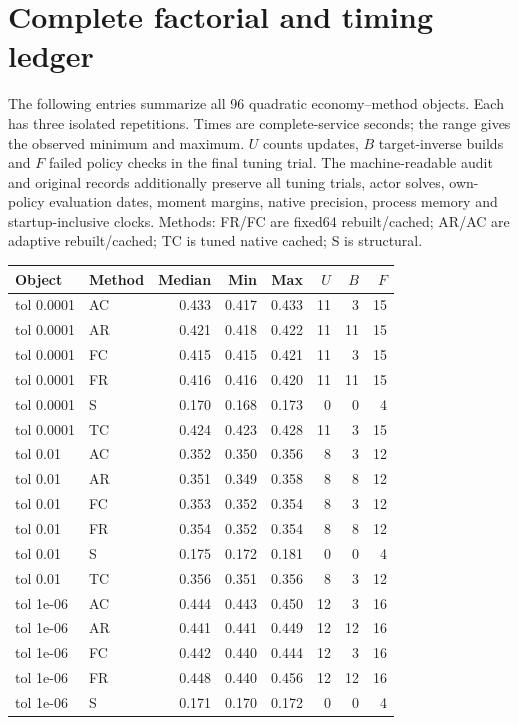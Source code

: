 \documentclass[ecta,nameyear,draft]{econsocart}
\theoremstyle{definition}
\theoremstyle{remark}
\begin{document}
\section{Complete factorial and timing ledger}\label{sec:r39ledger}
The following entries summarize all 96 quadratic economy--method objects. Each has three isolated repetitions. Times are complete-service seconds; the range gives the observed minimum and maximum. $U$ counts updates, $B$ target-inverse builds and $F$ failed policy checks in the final tuning trial. The machine-readable audit and original records additionally preserve all tuning trials, actor solves, own-policy evaluation dates, moment margins, native precision, process memory and startup-inclusive clocks. Methods: FR/FC are fixed64 rebuilt/cached; AR/AC are adaptive rebuilt/cached; TC is tuned native cached; S is structural.
\begin{longtable}{llrrrrrr}
\toprule Object & Method & Median & Min & Max & $U$ & $B$ & $F$\\\midrule\endhead
tol 0.0001 & AC & 0.433 & 0.417 & 0.433 & 11 & 3 & 15\\
tol 0.0001 & AR & 0.421 & 0.418 & 0.422 & 11 & 11 & 15\\
tol 0.0001 & FC & 0.415 & 0.415 & 0.421 & 11 & 3 & 15\\
tol 0.0001 & FR & 0.416 & 0.416 & 0.420 & 11 & 11 & 15\\
tol 0.0001 & S & 0.170 & 0.168 & 0.173 & 0 & 0 & 4\\
tol 0.0001 & TC & 0.424 & 0.423 & 0.428 & 11 & 3 & 15\\
tol 0.01 & AC & 0.352 & 0.350 & 0.356 & 8 & 3 & 12\\
tol 0.01 & AR & 0.351 & 0.349 & 0.358 & 8 & 8 & 12\\
tol 0.01 & FC & 0.353 & 0.352 & 0.354 & 8 & 3 & 12\\
tol 0.01 & FR & 0.354 & 0.352 & 0.354 & 8 & 8 & 12\\
tol 0.01 & S & 0.175 & 0.172 & 0.181 & 0 & 0 & 4\\
tol 0.01 & TC & 0.356 & 0.351 & 0.356 & 8 & 3 & 12\\
tol 1e-06 & AC & 0.444 & 0.443 & 0.450 & 12 & 3 & 16\\
tol 1e-06 & AR & 0.441 & 0.441 & 0.449 & 12 & 12 & 16\\
tol 1e-06 & FC & 0.442 & 0.440 & 0.444 & 12 & 3 & 16\\
tol 1e-06 & FR & 0.448 & 0.440 & 0.456 & 12 & 12 & 16\\
tol 1e-06 & S & 0.171 & 0.170 & 0.172 & 0 & 0 & 4\\

\end{longtable}
\end{document}
